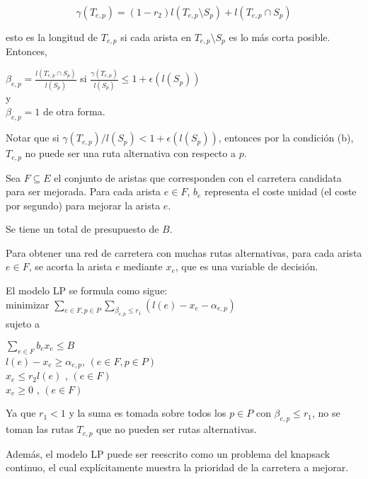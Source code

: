 \documentclass[10pt]{report}
\begin{document}
$$
\gamma\left(T_{e,p}\right) = \left( 1 - r_{2} \right) l \left(T_{e,p} \setminus S_{p} \right) + 
l \left(T_{e,p}  \cap   S_{p} \right)
$$
 
esto es la longitud de $T_{e,p}$ si cada arista en $T_{e,p} \setminus S_{p}$ es lo más corta posible. Entonces,

$\beta_{e,p} = \frac{l \left( T_{e,p}  \cap   S_{p}  \right)}    {l \left( S_{p} \right)}$ si $\frac{\gamma\left(T_{e,p}\right)}{l \left( S_{p} \right)} \leq 1 + \epsilon  \left( l  \left( S_{p}   \right) \right) $ \\
y \\
$\beta_{e,p} = 1$ de otra forma.
 
Notar que si $\gamma \left( T_{e,p} \right) / l \left( S_{p} \right) <1 +  \epsilon  \left( l  \left( S_{p}   \right) \right)$, entonces por la condición (b), $ T_{e,p}$ no puede ser una ruta alternativa con respecto a $p$.

Sea $F \subseteq E$ el conjunto de aristas que corresponden con el carretera candidata para ser mejorada.
Para cada arista $e \in F$, $b_{e}$ representa el coste unidad (el coste por segundo) para mejorar la arista $e$.

Se tiene un total de presupuesto de $B$.

Para obtener una red de carretera con muchas rutas alternativas, para cada arista $e \in F$, se acorta la arista $e$ mediante $x_{e}$, que es una variable de decisión.

El modelo LP se formula como sigue:\\
minimizar $\sum_{e \in F, p \in P } \sum_{\beta_{e,p} \leq r_{1}}   \left( l \left( e \right) - x_{e} - \alpha_{e,p}\right) $ \\
sujeto a

$\sum_{e\in F} b_{e}x_{e} \leq B$ \\
$l \left( e \right) - x_{e} \geq \alpha_{e,p}$,    $\left( e  \in F, p \in P\right)$\\
$x_{e} \leq  r_{2}l  \left( e \right)$ , $\left( e  \in F\right)$\\
$x_{e} \geq 0$ ,                         $\left( e  \in F\right)$

Ya que $r_{1} < 1$ y la suma es tomada sobre todos los $p \in P$ con $\beta_{e,p}  \leq r_{1}$, no se toman las rutas $T_{e,p}$ que no pueden ser rutas alternativas.

Además, el modelo LP puede ser reescrito como un problema del knapsack continuo, el cual explícitamente muestra la prioridad de la carretera a mejorar.
\end{document}
